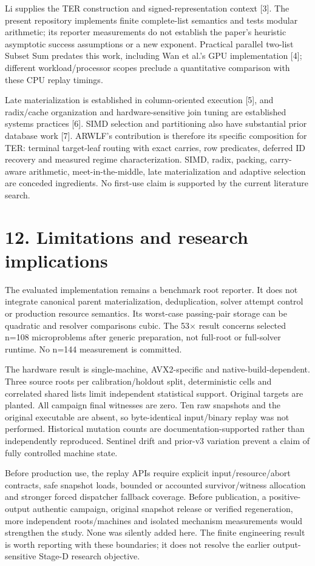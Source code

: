 \documentclass[10pt,letterpaper]{article}
\begin{document}
Li supplies the TER construction and signed-representation context [3]. The present repository implements finite complete-list semantics and tests modular arithmetic; its reporter measurements do not establish the paper's heuristic asymptotic success assumptions or a new exponent. Practical parallel two-list Subset Sum predates this work, including Wan et al.'s GPU implementation [4]; different workload/processor scopes preclude a quantitative comparison with these CPU replay timings.


Late materialization is established in column-oriented execution [5], and radix/cache organization and hardware-sensitive join tuning are established systems practices [6]. SIMD selection and partitioning also have substantial prior database work [7]. ARWLF's contribution is therefore its specific composition for TER: terminal target-leaf routing with exact carries, row predicates, deferred ID recovery and measured regime characterization. SIMD, radix, packing, carry-aware arithmetic, meet-in-the-middle, late materialization and adaptive selection are conceded ingredients. No first-use claim is supported by the current literature search.


\section*{12. Limitations and research implications}

The evaluated implementation remains a benchmark root reporter. It does not integrate canonical parent materialization, deduplication, solver attempt control or production resource semantics. Its worst-case passing-pair storage can be quadratic and resolver comparisons cubic. The 53\ensuremath{\times} result concerns selected n=108 microproblems after generic preparation, not full-root or full-solver runtime. No n=144 measurement is committed.


The hardware result is single-machine, AVX2-specific and native-build-dependent. Three source roots per calibration/holdout split, deterministic cells and correlated shared lists limit independent statistical support. Original targets are planted. All campaign final witnesses are zero. Ten raw snapshots and the original executable are absent, so byte-identical input/binary replay was not performed. Historical mutation counts are documentation-supported rather than independently reproduced. Sentinel drift and prior-v3 variation prevent a claim of fully controlled machine state.


Before production use, the replay APIs require explicit input/resource/abort contracts, safe snapshot loads, bounded or accounted survivor/witness allocation and stronger forced dispatcher fallback coverage. Before publication, a positive-output authentic campaign, original snapshot release or verified regeneration, more independent roots/machines and isolated mechanism measurements would strengthen the study. None was silently added here. The finite engineering result is worth reporting with these boundaries; it does not resolve the earlier output-sensitive Stage-D research objective.
\end{document}

